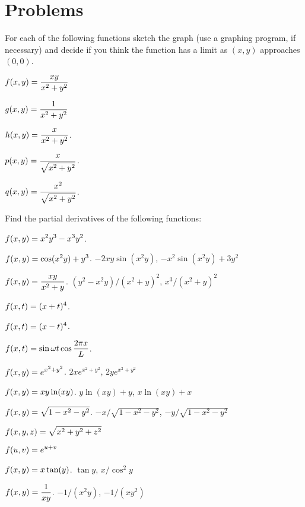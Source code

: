\section{Problems}
\label{sec:partial-derivative-problems}
\begin{multicols}{2}
\problemfont
\problem \label{prb:some-discontinuous-functions}
For each of the following functions sketch the graph (use a graphing program, if
necessary) and decide if you think the function has a limit as $(x,y)$
approaches $(0,0)$.

\subprob $\displaystyle f(x,y) = \frac{xy}{x^2+y^2}$

\subprob $\displaystyle g(x, y) = \frac{1}{x^2+y^2}$

\subprob $\displaystyle h(x, y) = \frac{x}{x^2+y^2}$.

\subprob $\displaystyle p(x, y) = \frac{x}{\sqrt{x^2+y^2}}$.

\subprob $\displaystyle q(x, y) = \frac{x^2}{\sqrt{x^2+y^2}}$.


\problem\label{prb:01compute-these-partials}
Find the partial derivatives of the following functions:

\subprob 
$\displaystyle f(x,y)=x^2y^3-x^3y^2$.

\subprob 
$\displaystyle f(x,y)=\cos(x^2y)+y^3$.
\answer
$-2xy\sin(x^2y)$, $-x^2\sin(x^2y)+3y^2$
\endanswer

\subprob $\displaystyle f(x,y)={xy\over x^2+y}$.
\answer
$(y^2-x^2y)/(x^2+y)^2$, $x^3/(x^2+y)^2$
\endanswer

\subprob $\displaystyle f(x, t) = (x+t)^4$.

\subprob $\displaystyle f(x, t) = (x-t)^4$.

\subprob $\displaystyle f(x, t) = \sin\omega t \cos\frac{2\pi x}{L}$.

\bigskip

\subprob $\displaystyle f(x,y)=e^{x^2+y^2}$.
\answer
$2xe^{x^2+y^2}$, $2ye^{x^2+y^2}$
\endanswer

\subprob $\displaystyle f(x,y)=xy\ln(xy)$.
\answer
$y\ln(xy)+y$, $x\ln(xy)+x$
\endanswer

\subprob $\displaystyle f(x,y)=\sqrt{1-x^2-y^2}$.
\answer
$-x/\sqrt{1-x^2-y^2}$, $-y/\sqrt{1-x^2-y^2}$
\endanswer

\subprob $\displaystyle f(x, y, z) = \sqrt{x^2 + y^2 + z^2}$

\subprob $\displaystyle f(u,v) = e^{u+v}$

\subprob $\displaystyle f(x,y)=x\tan(y)$.
\answer
$\tan y$, $x/\cos^2 y$
\endanswer

\subprob $\displaystyle f(x,y)={1\over xy}$.
\answer
$-1/(x^2y)$, $-1/(xy^2)$
\endanswer


\end{multicols}
